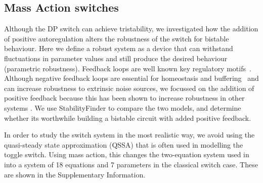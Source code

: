 {\subsection{Mass Action switches}						
Although the DP switch can achieve tristability, we investigated how the addition of positive autoregulation alters the robustness of the switch for bistable behaviour. Here we define a robust system as a device that can withstand fluctuations in parameter values and still produce the desired behaviour (parametric robustness). Feedback loops are well known key regulatory motifs~\autocite{Brandman:2005ci}. Although negative feedback loops are essential for homeostasis and buffering~\autocite{Thomas:1995id} and can increase robustness to extrinsic noise sources, we focussed on the addition of positive feedback because this has been shown to increase robustness in other systems \autocite{XXX}. We use StabilityFinder to compare the two models, and determine whether its worthwhile building a bistable circuit with added positive feedback.

In order to study the switch system in the most realistic way, we avoid using the quasi-steady state approximation (QSSA) that is often used in modelling the toggle switch. Using mass action, this changes the two-equation system used in~\textcite{Lu:2014kc}~\autocite{Lu:2014kc} into a system of 18 equations and 7 parameters in the classical switch case. These are shown in the Supplementary Information.%

}
